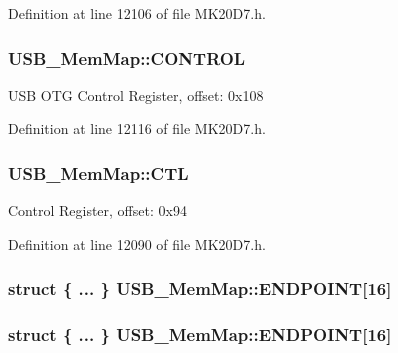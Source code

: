 Definition at line 12106 of file M\+K20\+D7.\+h.

\subsubsection[{\texorpdfstring{C\+O\+N\+T\+R\+OL}{CONTROL}}]{ U\+S\+B\+\_\+\+Mem\+Map\+::\+C\+O\+N\+T\+R\+OL}\hypertarget{struct_u_s_b___mem_map_a98ff4d7ab9c41c673ee41053dc484447}{}\label{struct_u_s_b___mem_map_a98ff4d7ab9c41c673ee41053dc484447}
U\+SB O\+TG Control Register, offset\+: 0x108 

Definition at line 12116 of file M\+K20\+D7.\+h.

\subsubsection[{\texorpdfstring{C\+TL}{CTL}}]{ U\+S\+B\+\_\+\+Mem\+Map\+::\+C\+TL}\hypertarget{struct_u_s_b___mem_map_a52b35d0e8644631558a65f9b7a9b8b4b}{}\label{struct_u_s_b___mem_map_a52b35d0e8644631558a65f9b7a9b8b4b}
Control Register, offset\+: 0x94 

Definition at line 12090 of file M\+K20\+D7.\+h.

\subsubsection[{\texorpdfstring{E\+N\+D\+P\+O\+I\+NT}{ENDPOINT}}]{\setlength{\rightskip}{0pt plus 5cm}struct \{ ... \}   U\+S\+B\+\_\+\+Mem\+Map\+::\+E\+N\+D\+P\+O\+I\+NT\mbox{[}16\mbox{]}}\hypertarget{struct_u_s_b___mem_map_ad951ce6c3849676cdda8056471f27b2b}{}\label{struct_u_s_b___mem_map_ad951ce6c3849676cdda8056471f27b2b}
\subsubsection[{\texorpdfstring{E\+N\+D\+P\+O\+I\+NT}{ENDPOINT}}]{\setlength{\rightskip}{0pt plus 5cm}struct \{ ... \}   U\+S\+B\+\_\+\+Mem\+Map\+::\+E\+N\+D\+P\+O\+I\+NT\mbox{[}16\mbox{]}}\hypertarget{struct_u_s_b___mem_map_a6457167d04293b48812e9031d1460227}{}\label{struct_u_s_b___mem_map_a6457167d04293b48812e9031d1460227}
